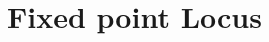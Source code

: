 \documentclass[10pt]{amsart}
\newtheorem{example}{Example}
\numberwithin{equation}{subsection}
\begin{document}
\section{Fixed point Locus}
\end{document}
